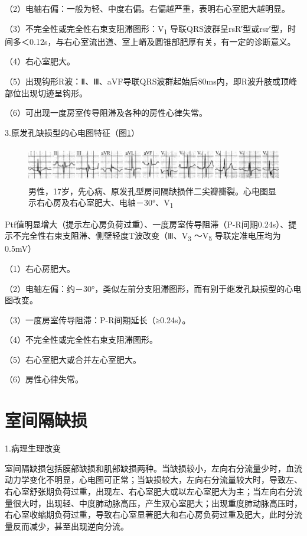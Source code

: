 （2）电轴右偏：一般为轻、中度右偏。右偏越严重，表明右心室肥大越明显。

（3）不完全性或完全性右束支阻滞图形：V\textsubscript{1}
导联QRS波群呈rsR′型或rsr′型，时间多＜0.12s，与右心室流出道、室上嵴及圆锥部肥厚有关，有一定的诊断意义。

（4）右心室肥大。

（5）出现钩形R波：Ⅱ、Ⅲ、aVF导联QRS波群起始后80ms内，即R波升肢或顶峰部位出现切迹呈钩形。

（6）可出现一度房室传导阻滞及各种的房性心律失常。

3.原发孔缺损型的心电图特征（图\ref{fig41-3}）

\begin{figure}[!htbp]
 \centering
 \includegraphics[width=5.78125in,height=0.63542in]{./images/Image00685.jpg}
 \captionsetup{justification=centering}
 \caption{男性，17岁，先心病、原发孔型房间隔缺损伴二尖瓣瓣裂。心电图显示右心房及右心室肥大、电轴－30°、V\textsubscript{1}}
 \label{fig41-3}
  \end{figure} 
Ptf值明显增大（提示左心房负荷过重）、一度房室传导阻滞（P-R间期0.24s）、提示不完全性右束支阻滞、侧壁轻度T波改变（Ⅲ、V\textsubscript{3}
～V\textsubscript{5} 导联定准电压均为0.5mV）

（1）右心房肥大。

（2）电轴左偏：约－30°，类似左前分支阻滞图形，而有别于继发孔缺损型的心电图改变。

（3）一度房室传导阻滞：P-R间期延长（≥0.24s）。

（4）不完全性或完全性右束支阻滞图形。

（5）右心室肥大或合并左心室肥大。

（6）房性心律失常。

\protect\hypertarget{text00049.htmlux5cux23subid582}{}{}

\section{室间隔缺损}

1.病理生理改变

室间隔缺损包括膜部缺损和肌部缺损两种。当缺损较小，左向右分流量少时，血流动力学变化不明显，心电图可正常；当缺损较大，左向右分流量较大时，导致左、右心室舒张期负荷过重，出现左、右心室肥大或以左心室肥大为主；当左向右分流量很大时，出现轻、中度肺动脉高压，产生双心室肥大；出现重度肺动脉高压时，右心室收缩期负荷过重，导致右心室显著肥大和右心房负荷过重及肥大，此时分流量反而减少，甚至出现逆向分流。

